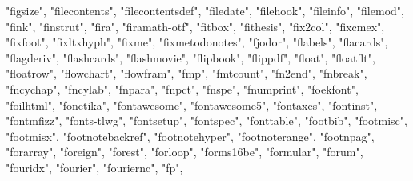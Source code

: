 \documentclass[
]{article}
\newenvironment{Shaded}{\begin{snugshade}}{\end{snugshade}}
\newcommand{\NormalTok}[1]{#1}
\newcommand{\StringTok}[1]{\textcolor[rgb]{0.31,0.60,0.02}{#1}}
\begin{document}
\begin{Shaded}
\begin{Highlighting}[]
\StringTok{"figsize"}\NormalTok{, }\StringTok{"filecontents"}\NormalTok{, }\StringTok{"filecontentsdef"}\NormalTok{, }\StringTok{"filedate"}\NormalTok{, }\StringTok{"filehook"}\NormalTok{, }
\StringTok{"fileinfo"}\NormalTok{, }\StringTok{"filemod"}\NormalTok{, }\StringTok{"fink"}\NormalTok{, }\StringTok{"finstrut"}\NormalTok{, }\StringTok{"fira"}\NormalTok{, }\StringTok{"firamath{-}otf"}\NormalTok{, }
\StringTok{"fitbox"}\NormalTok{, }\StringTok{"fithesis"}\NormalTok{, }\StringTok{"fix2col"}\NormalTok{, }\StringTok{"fixcmex"}\NormalTok{, }\StringTok{"fixfoot"}\NormalTok{, }\StringTok{"fixltxhyph"}\NormalTok{, }
\StringTok{"fixme"}\NormalTok{, }\StringTok{"fixmetodonotes"}\NormalTok{, }\StringTok{"fjodor"}\NormalTok{, }\StringTok{"flabels"}\NormalTok{, }\StringTok{"flacards"}\NormalTok{, }\StringTok{"flagderiv"}\NormalTok{, }
\StringTok{"flashcards"}\NormalTok{, }\StringTok{"flashmovie"}\NormalTok{, }\StringTok{"flipbook"}\NormalTok{, }\StringTok{"flippdf"}\NormalTok{, }\StringTok{"float"}\NormalTok{, }\StringTok{"floatflt"}\NormalTok{, }
\StringTok{"floatrow"}\NormalTok{, }\StringTok{"flowchart"}\NormalTok{, }\StringTok{"flowfram"}\NormalTok{, }\StringTok{"fmp"}\NormalTok{, }\StringTok{"fmtcount"}\NormalTok{, }\StringTok{"fn2end"}\NormalTok{, }
\StringTok{"fnbreak"}\NormalTok{, }\StringTok{"fncychap"}\NormalTok{, }\StringTok{"fncylab"}\NormalTok{, }\StringTok{"fnpara"}\NormalTok{, }\StringTok{"fnpct"}\NormalTok{, }\StringTok{"fnspe"}\NormalTok{, }
\StringTok{"fnumprint"}\NormalTok{, }\StringTok{"foekfont"}\NormalTok{, }\StringTok{"foilhtml"}\NormalTok{, }\StringTok{"fonetika"}\NormalTok{, }\StringTok{"fontawesome"}\NormalTok{, }
\StringTok{"fontawesome5"}\NormalTok{, }\StringTok{"fontaxes"}\NormalTok{, }\StringTok{"fontinst"}\NormalTok{, }\StringTok{"fontmfizz"}\NormalTok{, }\StringTok{"fonts{-}tlwg"}\NormalTok{, }
\StringTok{"fontsetup"}\NormalTok{, }\StringTok{"fontspec"}\NormalTok{, }\StringTok{"fonttable"}\NormalTok{, }\StringTok{"footbib"}\NormalTok{, }\StringTok{"footmisc"}\NormalTok{, }
\StringTok{"footmisx"}\NormalTok{, }\StringTok{"footnotebackref"}\NormalTok{, }\StringTok{"footnotehyper"}\NormalTok{, }\StringTok{"footnoterange"}\NormalTok{, }
\StringTok{"footnpag"}\NormalTok{, }\StringTok{"forarray"}\NormalTok{, }\StringTok{"foreign"}\NormalTok{, }\StringTok{"forest"}\NormalTok{, }\StringTok{"forloop"}\NormalTok{, }\StringTok{"forms16be"}\NormalTok{, }
\StringTok{"formular"}\NormalTok{, }\StringTok{"forum"}\NormalTok{, }\StringTok{"fouridx"}\NormalTok{, }\StringTok{"fourier"}\NormalTok{, }\StringTok{"fouriernc"}\NormalTok{, }\StringTok{"fp"}\NormalTok{, }

\end{Highlighting}
\end{Shaded}
\end{document}
